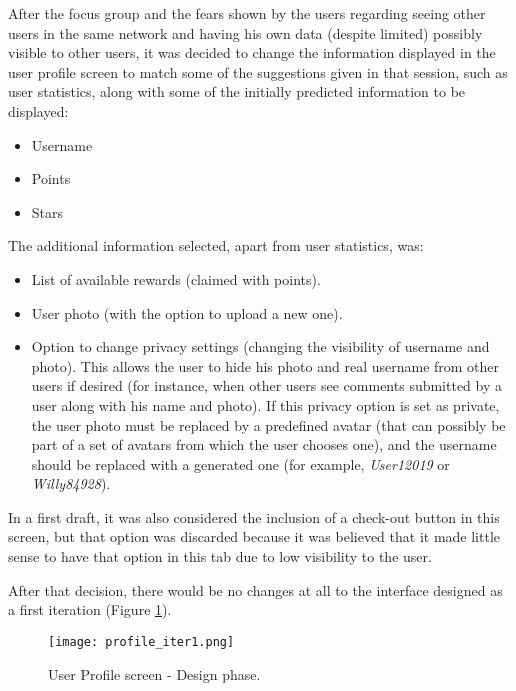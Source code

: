After the focus group and the fears shown by the users regarding seeing other users in the same network and having his own data (despite limited) possibly visible to other users, it was decided to change the information displayed in the user profile screen to match some of the suggestions given in that session, such as user statistics, along with some of the initially predicted information to be displayed:

\begin{itemize}
\item Username
\item Points
\item Stars
\end{itemize}

The additional information selected, apart from user statistics, was:

\begin{itemize}
\item List of available rewards (claimed with points).
\item User photo (with the option to upload a new one).
\item Option to change privacy settings (changing the visibility of username and photo). This allows the user to hide his photo and real username from other users if desired (for instance, when other users see comments submitted by a user along with his name and photo). If this privacy option is set as private, the user photo must be replaced by a predefined avatar (that can possibly be part of a set of avatars from which the user chooses one), and the username should be replaced with a generated one (for example, \emph{User12019} or \emph{Willy84928}).
\end{itemize}

In a first draft, it was also considered the inclusion of a check-out button in this screen, but that option was discarded because it was believed that it made little sense to have that option in this tab due to low visibility to the user.

After that decision, there would be no changes at all to the interface designed as a first iteration (Figure \ref{fig:profile_iter1}).

\begin{figure}[h!]
  \begin{center}
    \leavevmode
    \texttt{[image: profile\_iter1.png]}
    \caption{User Profile screen - Design phase.}
    \label{fig:profile_iter1}
  \end{center}
\end{figure}

